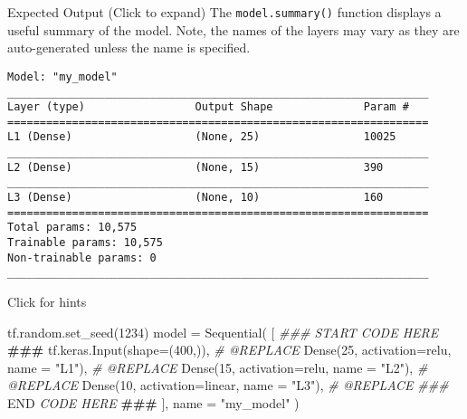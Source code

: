\documentclass[11pt]{article}
\newenvironment{Shaded}{}{}
\newcommand{\DecValTok}[1]{\textcolor[rgb]{0.25,0.63,0.44}{{#1}}}
\newcommand{\StringTok}[1]{\textcolor[rgb]{0.25,0.44,0.63}{{#1}}}
\newcommand{\CommentTok}[1]{\textcolor[rgb]{0.38,0.63,0.69}{\textit{{#1}}}}
\newcommand{\AlertTok}[1]{\textcolor[rgb]{1.00,0.00,0.00}{\textbf{{#1}}}}
\newcommand{\RegionMarkerTok}[1]{{#1}}
\newcommand{\NormalTok}[1]{{#1}}
\newcommand{\OperatorTok}[1]{\textcolor[rgb]{0.40,0.40,0.40}{{#1}}}
\begin{document}
    Expected Output (Click to expand) The \texttt{model.summary()} function
displays a useful summary of the model. Note, the names of the layers
may vary as they are auto-generated unless the name is specified.

\begin{verbatim}
Model: "my_model"
_________________________________________________________________
Layer (type)                 Output Shape              Param #   
=================================================================
L1 (Dense)                   (None, 25)                10025     
_________________________________________________________________
L2 (Dense)                   (None, 15)                390       
_________________________________________________________________
L3 (Dense)                   (None, 10)                160       
=================================================================
Total params: 10,575
Trainable params: 10,575
Non-trainable params: 0
_________________________________________________________________
\end{verbatim}

    Click for hints

\begin{Shaded}
\begin{Highlighting}[]
\NormalTok{tf.random.set\_seed(}\DecValTok{1234}\NormalTok{)}
\NormalTok{model }\OperatorTok{=}\NormalTok{ Sequential(}
\NormalTok{    [               }
        \CommentTok{\#\#\# START CODE HERE }\AlertTok{\#\#\#}\CommentTok{ }
\NormalTok{        tf.keras.Input(shape}\OperatorTok{=}\NormalTok{(}\DecValTok{400}\NormalTok{,)),     }\CommentTok{\# @REPLACE }
\NormalTok{        Dense(}\DecValTok{25}\NormalTok{, activation}\OperatorTok{=}\StringTok{\textquotesingle{}relu\textquotesingle{}}\NormalTok{, name }\OperatorTok{=} \StringTok{"L1"}\NormalTok{), }\CommentTok{\# @REPLACE }
\NormalTok{        Dense(}\DecValTok{15}\NormalTok{, activation}\OperatorTok{=}\StringTok{\textquotesingle{}relu\textquotesingle{}}\NormalTok{,  name }\OperatorTok{=} \StringTok{"L2"}\NormalTok{), }\CommentTok{\# @REPLACE  }
\NormalTok{        Dense(}\DecValTok{10}\NormalTok{, activation}\OperatorTok{=}\StringTok{\textquotesingle{}linear\textquotesingle{}}\NormalTok{, name }\OperatorTok{=} \StringTok{"L3"}\NormalTok{),  }\CommentTok{\# @REPLACE }
        \CommentTok{\#\#\# }\RegionMarkerTok{END}\CommentTok{ CODE HERE }\AlertTok{\#\#\#}\CommentTok{ }
\NormalTok{    ], name }\OperatorTok{=} \StringTok{"my\_model"} 
\NormalTok{)}
\end{Highlighting}
\end{Shaded}
\end{document}
